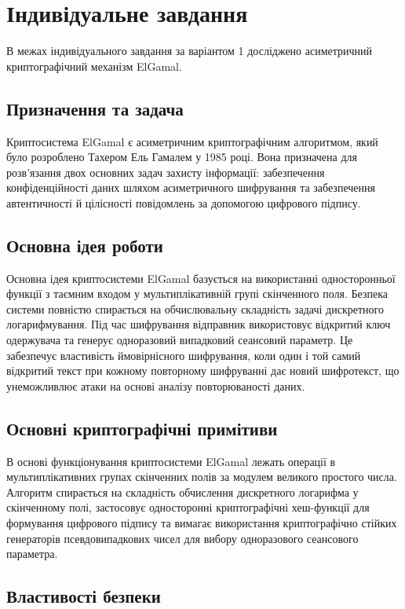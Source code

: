 \section{Індивідуальне завдання}

В межах індивідуального завдання за варіантом 1 досліджено асиметричний криптографічний механізм
ElGamal.

\subsection{Призначення та задача}

Криптосистема ElGamal є асиметричним криптографічним алгоритмом, який було розроблено Тахером Ель
Гамалем у 1985 році. Вона призначена для розв'язання двох основних задач захисту інформації: забезпечення
конфіденційності даних шляхом асиметричного шифрування та забезпечення автентичності й цілісності
повідомлень за допомогою цифрового підпису.

\subsection{Основна ідея роботи}

Основна ідея криптосистеми ElGamal базується на використанні односторонньої функції з таємним входом у
мультиплікативній групі скінченного поля. Безпека системи повністю спирається на обчислювальну складність
задачі дискретного логарифмування. Під час шифрування відправник використовує відкритий ключ
одержувача та генерує одноразовий випадковий сеансовий параметр. Це забезпечує властивість
ймовірнісного шифрування, коли один і той самий відкритий текст при кожному повторному шифруванні дає
новий шифротекст, що унеможливлює атаки на основі аналізу повторюваності даних.

\subsection{Основні криптографічні примітиви}

В основі функціонування криптосистеми ElGamal лежать операції в мультиплікативних групах скінченних
полів за модулем великого простого числа. Алгоритм спирається на складність обчислення дискретного
логарифма у скінченному полі, застосовує односторонні криптографічні хеш-функції для формування
цифрового підпису та вимагає використання криптографічно стійких генераторів псевдовипадкових чисел
для вибору одноразового сеансового параметра.

\subsection{Властивості безпеки}


